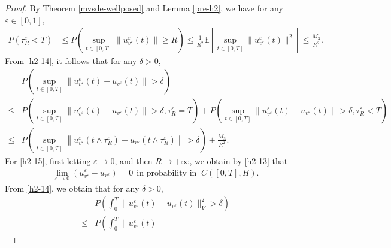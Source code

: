 \documentclass[11pt]{article}
\numberwithin{equation}{section}
\theoremstyle{plain}
\def\geq{\geqslant}
\def\leq{\leqslant}
\begin{document}
\begin{proof}
    By Theorem \ref{mvsde-wellposed} and Lemma \ref{pre-h2}, we have for any $\varepsilon \in [0,1]$,
    \begin{align}\label{h2-14}
        P \left( \tau_R^\varepsilon < T \right)
        & \leq  P
        \left( \sup_{t \in [0,T]}
        \| u_{v^\varepsilon}^\varepsilon(t) \| \geq R
        \right)
        \leq \frac{1}{R^2}
        \mathbb{E}
        \left[ \sup_{t \in [0,T]}
        \| u_{v^\varepsilon}^\varepsilon(t) \|^2
        \right]
        \leq \frac{M_3}{R^2} .
    \end{align}
    From \eqref{h2-14}, it follows that for any $\delta > 0$,
    \begin{align} \label{h2-15}
        & P
        \left( \sup_{t \in [0,T]}
        \left\| u_{v^\varepsilon}^\varepsilon(t)
        - u_{v^\varepsilon}(t)
        \right\| > \delta
        \right)  \nonumber \\
        \leq & P
        \left( \sup_{t \in [0,T]}
        \left\| u_{v^\varepsilon}^\varepsilon(t)
        - u_{v^\varepsilon}(t)
        \right\|  >  \delta,
        \tau_R^{\varepsilon} = T
        \right)
        + P
        \left( \sup_{t \in [0,T]}
        \left\| u_{v^\varepsilon}^\varepsilon(t)
        - u_{v^\varepsilon}(t)
        \right\|  >  \delta,
        \tau_R^{\varepsilon} < T
        \right)  \nonumber \\
        \leq & P
        \left( \sup_{t \in [0,T]}
        \left\| u_{v^\varepsilon}^\varepsilon(t \wedge \tau_R^{\varepsilon})
        - u_{v^\varepsilon}(t \wedge \tau_R^{\varepsilon})
        \right\|  >  \delta
        \right)
        + \frac{M_3}{R^2} .
    \end{align}
    For \eqref{h2-15}, first letting $\varepsilon \rightarrow 0$, and then $R \rightarrow +\infty$,
    we obtain by \eqref{h2-13} that
    \begin{align}\label{h2-16}
        \lim_{\varepsilon \rightarrow 0}
        \left( u_{v^\varepsilon}^\varepsilon
        - u_{v^\varepsilon}
        \right) = 0
        \ \   \text{in probability
            in } \  C([0,T],H).
    \end{align}
    From \eqref{h2-14}, we obtain that for any $\delta > 0$,
    \begin{align} \label{h2-17}
        & P
        \left( \int_0^T
        \| u_{v^\varepsilon}^\varepsilon(t)
        - u_{v^\varepsilon}(t)
        \|_V^2  > \delta
        \right)  \nonumber \\
        \leq & P
        \left( \int_0^T
        \| u_{v^\varepsilon}^\varepsilon(t)

\end{align}
\end{proof}
\end{document}
